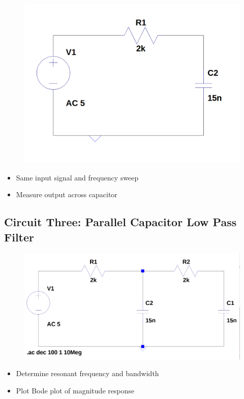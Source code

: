 \documentclass[12pt]{article}
\begin{document}
\begin{figure}[H]
	\includegraphics[width=\textwidth]{e6_02}
\end{figure}
\begin{itemize}
	\item Same input signal and frequency sweep
	\item Measure output across capacitor
\end{itemize}

\subsection{Circuit Three: Parallel Capacitor Low Pass Filter}

\begin{figure}[H]
	\includegraphics[width=\textwidth]{e6_03}
\end{figure}
\begin{itemize}
	\item Determine resonant frequency and bandwidth
	\item Plot Bode plot of magnitude response
\end{itemize}
\end{document}

